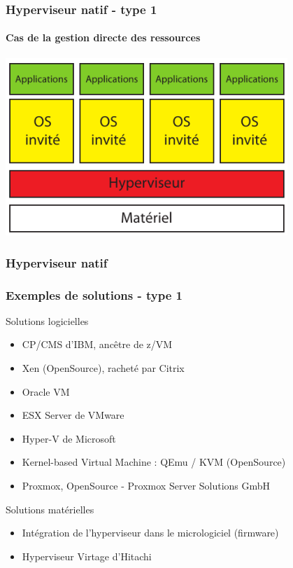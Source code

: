 \begin{frame}
\frametitle{Hyperviseur natif - type 1}
\framesubtitle{Cas de la gestion directe des ressources}
\includegraphics[width=0.8\textwidth]{../illustration/hyperviseur_natif.pdf}
\end{frame}

\begin{frame}
\frametitle{Hyperviseur natif}
\frametitle{Exemples de solutions - type 1}
\begin{exampleblock}{Solutions logicielles}
\begin{itemize}
\item CP/CMS d'IBM, ancêtre de z/VM
\item Xen (OpenSource), racheté par Citrix
\item Oracle VM
\item ESX Server de VMware
\item Hyper-V de Microsoft
\item Kernel-based Virtual Machine : QEmu / KVM (OpenSource)
\item Proxmox, OpenSource - Proxmox Server Solutions GmbH
\end{itemize}
\end{exampleblock}
\begin{exampleblock}{Solutions matérielles}
\begin{itemize}
\item Intégration de l'hyperviseur dans le micrologiciel (firmware)
\item Hyperviseur Virtage d'Hitachi
\end{itemize}
\end{exampleblock}
\end{frame}

